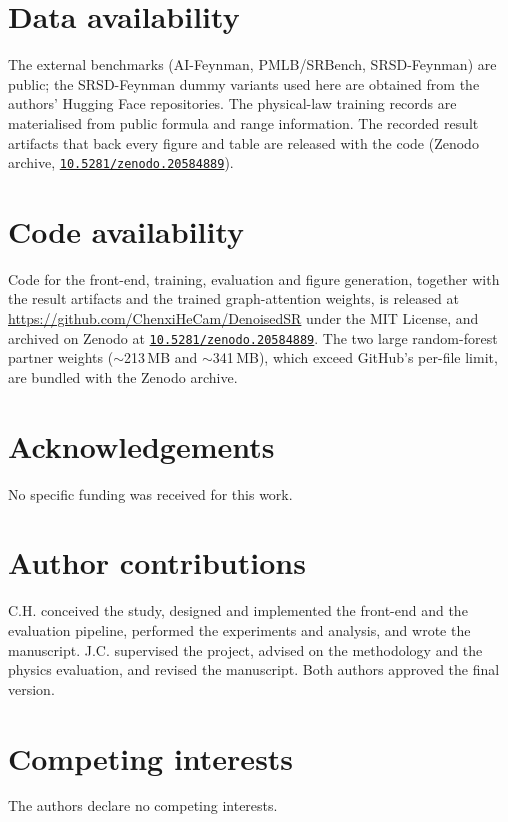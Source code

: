 \documentclass[11pt]{article}
\begin{document}
\section*{Data availability}
The external benchmarks (AI-Feynman, PMLB/SRBench, SRSD-Feynman) are
public\cite{udrescu2020aifeynman,olson2017pmlb,lafuente2024srbench,matsubara2024srsd};
the SRSD-Feynman dummy variants used here are obtained from the authors' Hugging
Face repositories. The physical-law training records are materialised from public
formula and range information. The recorded result artifacts that back every
figure and table are released with the code (Zenodo archive,
\href{https://doi.org/10.5281/zenodo.20584889}{\nolinkurl{10.5281/zenodo.20584889}}).

\section*{Code availability}
Code for the front-end, training, evaluation and figure generation, together
with the result artifacts and the trained graph-attention weights, is released
at \url{https://github.com/ChenxiHeCam/DenoisedSR} under the MIT License, and
archived on Zenodo at
\href{https://doi.org/10.5281/zenodo.20584889}{\nolinkurl{10.5281/zenodo.20584889}}.
The two large random-forest partner weights ($\sim$213\,MB and $\sim$341\,MB),
which exceed GitHub's per-file limit, are bundled with the Zenodo archive.

\section*{Acknowledgements}
No specific funding was received for this work.

\section*{Author contributions}
C.H. conceived the study, designed and implemented the front-end and the evaluation
pipeline, performed the experiments and analysis, and wrote the manuscript. J.C.
supervised the project, advised on the methodology and the physics evaluation, and
revised the manuscript. Both authors approved the final version.

\section*{Competing interests}
The authors declare no competing interests.



\end{document}
